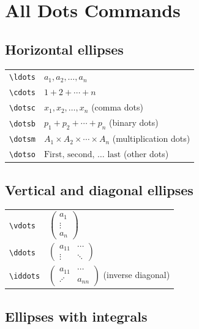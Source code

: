 \documentclass{article}
\begin{document}
\section*{All Dots Commands}

\subsection*{Horizontal ellipses}

\noindent
\begin{tabular}{ll}
\texttt{\textbackslash{}ldots}   & $a_1, a_2, \ldots, a_n$ \\
\texttt{\textbackslash{}cdots}   & $1 + 2 + \cdots + n$ \\
\texttt{\textbackslash{}dotsc}   & $x_1, x_2, \dotsc, x_n$ (comma dots) \\
\texttt{\textbackslash{}dotsb}   & $p_1 + p_2 + \dotsb + p_n$ (binary dots) \\
\texttt{\textbackslash{}dotsm}   & $A_1 \times A_2 \times \dotsm \times A_n$ (multiplication dots) \\
\texttt{\textbackslash{}dotso}   & $\text{First, second, } \dotso \text{ last}$ (other dots) \\
\end{tabular}

\subsection*{Vertical and diagonal ellipses}

\noindent
\begin{tabular}{ll}
\texttt{\textbackslash{}vdots}   & $\begin{pmatrix} a_1 \\ \vdots \\ a_n \end{pmatrix}$ \\
\texttt{\textbackslash{}ddots}   & $\begin{pmatrix} a_{11} & \cdots \\ \vdots & \ddots \end{pmatrix}$ \\
\texttt{\textbackslash{}iddots}   & $\begin{pmatrix} a_{11} & \cdots \\ \iddots & a_{nn} \end{pmatrix}$ (inverse diagonal) \\
\end{tabular}

\subsection*{Ellipses with integrals}
\end{document}
